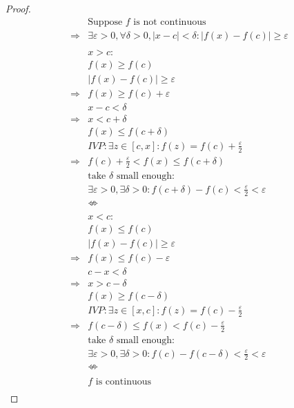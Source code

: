 \documentclass{article}
\begin{document}
\begin{proof}
    \begin{align*}
        &\text{Suppose }f\text{ is not continuous}\\
        \Rightarrow&\exists \varepsilon>0,\forall \delta>0,|x-c|<\delta:|f(x)-f(c)|\geqslant\varepsilon\\
        &\\
        &x>c:\\
        &f(x)\geqslant f(c)\\
        &|f(x)-f(c)|\geqslant\varepsilon\\
        \Rightarrow&f(x)\geqslant f(c)+\varepsilon\\
        &x-c<\delta\\
        \Rightarrow&x<c+\delta\\
        &f(x)\leqslant f(c+\delta)\\
        &IVP: \exists z\in [c,x]:f(z)=f(c)+\frac{\varepsilon}{2}\\
        \Rightarrow&f(c)+\frac{\varepsilon}{2}<f(x)\leqslant f(c+\delta)\\
        &\text{take }\delta\text{ small enough}:\\
        &\exists\varepsilon>0,\exists \delta>0:f(c+\delta)-f(c)<\frac{\varepsilon}{2}<\varepsilon\\
        &\nLeftrightarrow \\
        &\\
        &x<c:\\
        &f(x)\leqslant f(c)\\
        &|f(x)-f(c)|\geqslant\varepsilon\\
        \Rightarrow&f(x)\leqslant f(c)-\varepsilon\\
        &c-x<\delta\\
        \Rightarrow&x>c-\delta\\
        &f(x)\geqslant f(c-\delta)\\
        &IVP: \exists z\in [x,c]:f(z)=f(c)-\frac{\varepsilon}{2}\\
        \Rightarrow&f(c-\delta)\leqslant f(x)<f(c)-\frac{\varepsilon}{2}\\
        &\text{take }\delta\text{ small enough}:\\
        &\exists\varepsilon>0,\exists \delta>0:f(c)-f(c-\delta)<\frac{\varepsilon}{2}<\varepsilon\\
        &\nLeftrightarrow \\
        &\\
        &f\text{ is continuous}\\
    \end{align*}
\end{proof}
\end{document}
